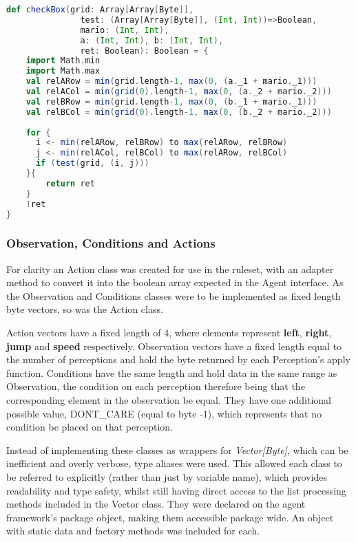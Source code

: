 \begin{minipage}{0.9\linewidth}
\centering
\begin{lstlisting}[language=scala]
def checkBox(grid: Array[Array[Byte]], 
               test: (Array[Array[Byte]], (Int, Int))=>Boolean, 
               mario: (Int, Int), 
               a: (Int, Int), b: (Int, Int), 
               ret: Boolean): Boolean = {
    import Math.min
    import Math.max
    val relARow = min(grid.length-1, max(0, (a._1 + mario._1)))
    val relACol = min(grid(0).length-1, max(0, (a._2 + mario._2)))
    val relBRow = min(grid.length-1, max(0, (b._1 + mario._1)))
    val relBCol = min(grid(0).length-1, max(0, (b._2 + mario._2)))
    
    for {
      i <- min(relARow, relBRow) to max(relARow, relBRow)
      j <- min(relACol, relBCol) to max(relARow, relBCol)
      if (test(grid, (i, j)))
    }{
        return ret
    }
    !ret
}
\end{lstlisting}
\end{minipage}


\subsubsection{Observation, Conditions and Actions}

For clarity an Action class was created for use in the ruleset, with an adapter method to convert it into the boolean array expected in the Agent interface. As the Observation and Conditions classes were to be implemented as fixed length byte vectors, so was the Action class.

Action vectors have a fixed length of 4, where elements represent \textbf{left}, \textbf{right}, \textbf{jump} and \textbf{speed} respectively. Observation vectors have a fixed length equal to the number of perceptions and hold the byte returned by each Perception's apply function. Conditions have the same length and hold data in the same range as Observation, the condition on each perception therefore being that the corresponding element in the observation be equal. They have one additional possible value, {\footnotesize DONT\_CARE} (equal to byte -1), which represents that no condition be placed on that perception.

Instead of implementing these classes as wrappers for \emph{Vector[Byte]}, which can be inefficient and overly verbose, type aliases were used. This allowed each class to be referred to explicitly (rather than just by variable name), which provides readability and type safety, whilst still having direct access to the list processing methods included in the Vector class. They were declared on the agent framework's package object, making them accessible package wide. An object with static data and factory methods was included for each.

